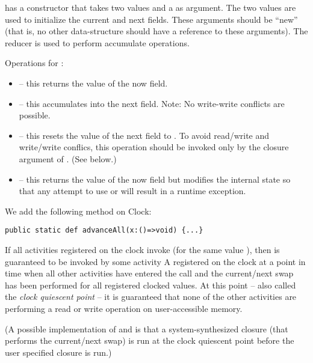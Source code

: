  has a constructor that takes two  values and a
 as argument. The two  values are used to initialize the
current and next fields. These arguments should be ``new'' (that is, no
other data-structure should have a reference to these arguments). The
reducer is used to perform accumulate operations.

Operations for :
\begin{itemize}
\item {} -- this returns the value of the now field. 
\item{} -- this accumulates  into the next field. Note: No
     write-write conflicts are possible.
\item{} -- this resets the value of the next field to . To avoid
     read/write and write/write conflics, this operation should be
     invoked only by the closure argument of
     . (See below.)
\item {} -- this returns the value of the now field but
     modifies the internal state so that any attempt to use  
     or  will result in a runtime exception.
\end{itemize}

We add the following method on Clock:
\begin{lstlisting}
public static def advanceAll(x:()=>void) {...}
\end{lstlisting}

If all activities registered on the clock invoke 
(for the same value ), then  is guaranteed to be
invoked by some activity A registered on the clock at a point in time
when all other activities have entered the  call
and the current/next swap has been performed for all registered
clocked values.  At this point -- also called the {\em clock quiescent
point} -- it is guaranteed that none of the other activities are
performing a read or write operation on user-accessible memory.

(A possible implementation of  and
 is that a system-synthesized closure (that
performs the current/next swap) is run at the clock quiescent point
before the user specified closure is run.)

